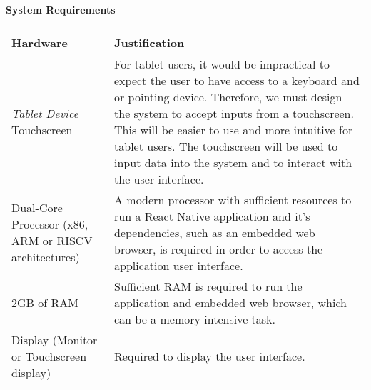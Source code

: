 \documentclass[../../../main.tex]{subfiles}
\begin{document}
\paragraph{System Requirements}

\paragraph{} %

\begin{tabular}{ |p{}|p{}| }
    \hline
    \textbf{Hardware}                                    & \textbf{Justification}                                                                                                                                                                                                                                   \\
    \hline
    \textit{Tablet Device}\newline
    Touchscreen                                          & For tablet users, it would be impractical to expect the user to have access to a keyboard and or pointing device. Therefore, we must design the system to accept inputs from a touchscreen.
    This will be easier to use and more intuitive for tablet users.
    The touchscreen will be used to input data into the system and to interact with the user interface.                                                                                                                                                                                                             \\
    \hline
    Dual-Core Processor
    \newline(x86, ARM or RISCV architectures)            &
    A modern processor with sufficient resources to run a React Native application and it's dependencies, such as an embedded web browser, is required in order to access the application user interface.                                                                                                           \\
    \hline
    2GB of RAM                                           & Sufficient RAM is required to run the application and embedded web browser, which can be a memory intensive task.                                                                                                                                        \\
    \hline
    Display (Monitor or Touchscreen display)             & Required to display the user interface.                                                                                                                                                                                                                  \\

\end{tabular}
\end{document}

